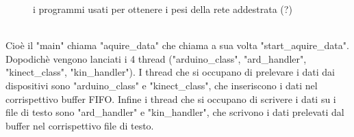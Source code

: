 \documentclass[10pt,a4paper]{article}
\begin{document}
\begin{figure}[h]
\caption{i programmi usati per ottenere i pesi della rete addestrata (?)}
\end{figure}
\\
Cio\`e il "main" chiama "aquire\_data" che chiama a sua volta "start\_aquire\_data". Dopodich\`e vengono lanciati i 4 thread ("arduino\_class", "ard\_handler", "kinect\_class", "kin\_handler"). I thread che si occupano di prelevare i dati dai dispositivi sono "arduino\_class" e "kinect\_class", che inseriscono i dati nel corrispettivo buffer FIFO. Infine i thread che si occupano di scrivere i dati su i file di testo sono "ard\_handler" e "kin\_handler", che scrivono i dati prelevati dal buffer nel corrispettivo file di testo.
\end{document}

